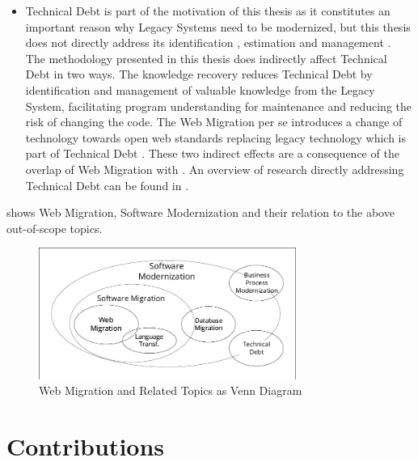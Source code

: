 \begin{itemize}
\item
  \gls{Technical Debt} is part of the motivation of this thesis as it constitutes an important reason why \glspl{Legacy System} need to be modernized, but this thesis does not directly address its identification \autocite{Li2015TDSMS}, estimation \autocite{Curtis2012EstimatingTD} and management \autocite{Yli-Huumo2016TD,Li2015TDSMS}.
The methodology presented in this thesis does indirectly affect \gls{Technical Debt} in two ways.
The knowledge recovery reduces \gls{Technical Debt} by identification and management of valuable knowledge from the \gls{Legacy System}, facilitating program understanding for maintenance and reducing the risk of changing the code.
The \gls{Web Migration} per se introduces a change of technology towards open \Gls{web} standards replacing legacy technology which is part of \gls{Technical Debt} \autocite{Yli-Huumo2016TD}.
These two indirect effects are a consequence of the overlap of \gls{Web Migration} with .
An overview of research directly addressing \gls{Technical Debt} can be found in \autocite{Li2015TDSMS}.
\end{itemize}

 shows \gls{Web Migration}, \gls{Software Modernization} and their relation to the above out-of-scope topics.

\begin{figure}
\hypertarget{fig:modernization-migration}{%
\centering
\includegraphics[width=0.75\textwidth]{../figures/modernization-migration.pdf}
\caption{\gls{Web Migration} and Related Topics as Venn Diagram}\label{fig:modernization-migration}
}
\end{figure}

\hypertarget{contributions}{%
\section{Contributions}\label{contributions}}

